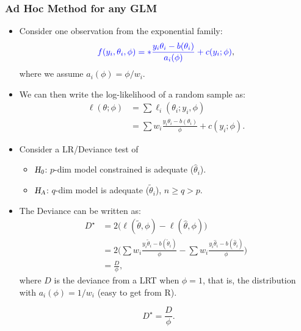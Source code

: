 \documentclass[oneside]{book}\usepackage[]{graphicx}\usepackage[svgnames]{xcolor}
\let\exp\relax%
\newcommand{\HN}{\textsl{H}_{\textsl{0}}}%
\newcommand{\HA}{\textsl{H}_{\textsl{A}}}%
\begin{document}
\subsubsection*{Ad Hoc Method for any GLM}
\begin{itemize}
      \item Consider one observation from the exponential family:
            \[ \textcolor{Blue}{f(y_i,\theta_i,\phi)=\exp*{\frac{y_i\theta_i-b(\theta_i)}{a_i(\phi)}+c(y_i;\phi)}}, \]
            where we assume $ a_i(\phi)=\phi/w_i $.
      \item We can then write the log-likelihood of a random sample as:
            \begin{align*}
                  \ell(\theta;\phi)
                   & =\sum \ell_i(\theta_i;y_i,\phi)                             \\
                   & =\sum w_i \frac{y_i\theta_i-b(\theta_i)}{\phi}+c(y_i;\phi).
            \end{align*}
      \item Consider a LR/Deviance test of
            \begin{itemize}
                  \item $ \HN $: $ p $-dim model constrained is adequate ($ \hat{\theta}_i $).
                  \item $ \HA $: $ q $-dim model is adequate ($ \tilde{\theta}_i $), $ n\ge q>p $.
            \end{itemize}
      \item The Deviance can be written as:
            \begin{align*}
                  D^\star
                   & =2\bigl(\ell(\tilde{\theta},\phi)-\ell(\hat{\theta},\phi)\bigr)                                                                            \\
                   & =2\biggl(\sum  w_i \frac{y_i\tilde{\theta}_i-b(\tilde{\theta}_i)}{\phi} -\sum w_i \frac{y_i\hat{\theta}_i-b(\hat{\theta}_i)}{\phi} \biggr) \\
                   & =\frac{D}{\phi},
            \end{align*}
            where $ D $ is the deviance from a LRT when $ \phi=1 $, that is, the distribution with $ a_i(\phi)=1/w_i $ (easy to get from R).
\end{itemize}
\[ D^\star=\frac{D}{\phi}. \]
\end{document}
